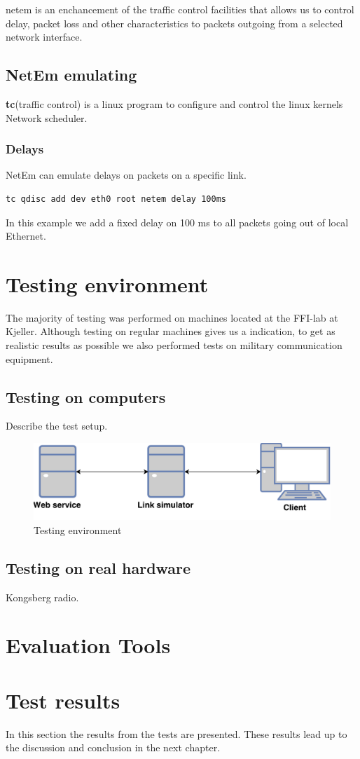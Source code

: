 
\gls{netem} is an enchancement of the traffic control facilities that allows us
to control delay, packet loss and other characteristics to packets outgoing from
a selected network interface.

\subsection{NetEm emulating}

\textbf{tc}(traffic control) is a linux program to configure and control the
linux kernels Network scheduler.

\subsubsection{Delays}

NetEm can emulate delays on packets on a specific link.

\begin{lstlisting}[frame=single, caption="Emulating delay"]
  tc qdisc add dev eth0 root netem delay 100ms
\end{lstlisting}

In this example we add a fixed delay on 100 ms to all packets going out of local
Ethernet.

\section{Testing environment}

The majority of testing was performed on machines located at the FFI-lab at
Kjeller. Although testing on regular machines gives us a indication, to get as
realistic results as possible we also performed tests on military communication
equipment.

\subsection{Testing on computers}
Describe the test setup.

\begin{figure}[h]
\includegraphics[scale=0.6]{images/testing_environment.pdf}
\caption{Testing environment}
\label{figure-testing-environment}
\end{figure}

\subsection{Testing on real hardware}
Kongsberg radio.


\section{Evaluation Tools}

\section{Test results}

In this section the results from the tests are presented. These results lead up to the discussion and conclusion in the next chapter.
